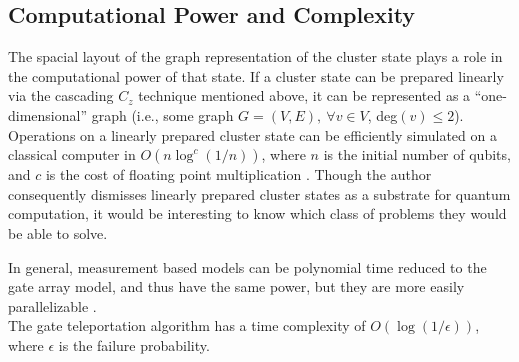 \documentclass[twocolumn]{Styles/IEEEtran11}
\begin{document}
\subsection{Computational Power and Complexity}
The spacial layout of the graph representation of the cluster state plays a role in the computational power of that state. If a cluster state can be prepared linearly via the cascading $C_z$ technique mentioned above, it can be represented as a  ``one-dimensional'' graph (i.e., some graph $G=(V,E),\ \forall v\in V$, deg$(v)\leq 2$). Operations on a linearly prepared cluster state can be efficiently simulated on a classical computer in $O(n\log ^c (1/n))$, where $n$ is the initial number of qubits, and $c$ is the cost of floating point multiplication \cite{nielsen2006cluster}. Though the author consequently dismisses linearly prepared cluster states as a substrate for quantum computation, it would be interesting to know which class of problems they would be able to solve.

In general, measurement based models can be polynomial time reduced to the gate array model, and thus have the same power, but they are more easily parallelizable \cite{jozsa2006introduction}.\\
The gate teleportation algorithm \cite{nielsen108020universal} has a time complexity of $O(\log (1/\epsilon))$, where $\epsilon$ is the failure probability.







\end{document}
